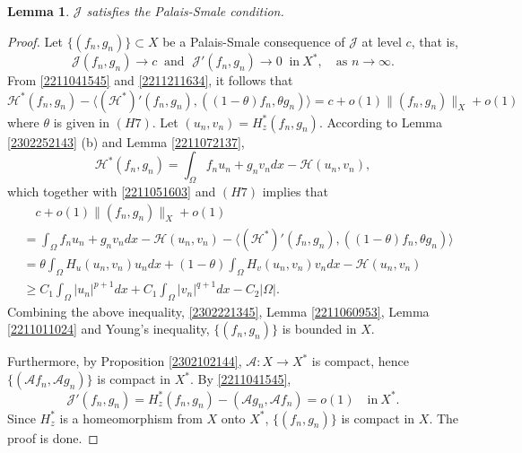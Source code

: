 \documentclass[10pt]{article}
\numberwithin{equation}{section}
\newtheorem{lemma}[theorem]{Lemma}
\numberwithin{equation}{section}
\begin{document}
\begin{lemma}\label{2211171422}
$\mathcal J$ satisfies the Palais-Smale condition.
\end{lemma}
\begin{proof}
 Let $\{(f_n, g_n)\}\subset X$ be a Palais-Smale consequence of $\mathcal{J}$ at level $c$, that is,
\begin{equation}\label{2211041545}
\mathcal{J}(f_n, g_n)\to c\;\; \mbox{and }\; \mathcal{J}'(f_n, g_n)\to 0\;\; \text{in}~X^*, \quad \mbox{as $n\to \infty$}.
\end{equation}
From \eqref{2211041545} and \eqref{2211211634}, it follows that
\begin{equation}\label{2211051603}
\mathcal{H}^*(f_n, g_n)-\langle (\mathcal{H}^*)'(f_n, g_n), ((1-\theta) f_n, \theta g_n)\rangle=c+o(1)\|(f_n, g_n)\|_{X}+o(1)
\end{equation}
where $\theta$ is given in $(H7)$. Let $(u_n ,v_n)=H^*_z(f_n, g_n)$. According to Lemma \ref{2302252143} (b) and Lemma \ref{2211072137},
\begin{equation}\label{2302221345}
\mathcal{H}^*(f_n, g_n)=\int_{\Omega}f_nu_n+g_nv_ndx - \mathcal{H}(u_n, v_n),
\end{equation}
which together with \eqref{2211051603} and $(H7)$ implies that
\[
\begin{aligned}
&\quad c+o(1)\|(f_n, g_n)\|_{X}+o(1)\\
& = \int_{\Omega}f_nu_n+g_nv_n dx - \mathcal{H}(u_n, v_n)-\langle (\mathcal{H}^*)'(f_n, g_n), ((1-\theta) f_n, \theta g_n)\rangle\\
& = \theta\int_{\Omega} H_u(u_n, v_n)u_ndx+(1-\theta)\int_{\Omega} H_v(u_n, v_n)v_ndx- \mathcal{H}(u_n, v_n)\\
& \ge C_1\int_{\Omega}|u_n|^{p+1}dx+C_1\int_{\Omega}|v_n|^{q+1}dx-C_2|\Omega|.
\end{aligned}
\]
Combining the above inequality, \eqref{2302221345}, Lemma \ref{2211060953}, Lemma \ref{2211011024} and Young's inequality,  $\{(f_n, g_n)\}$ is bounded in $X$.

Furthermore, by Proposition \ref{2302102144}, $\mathcal{A}: X\to X^*$ is compact, hence $\{(\mathcal{A}f_n, \mathcal{A}g_n)\}$ is compact in $X^*$. By \eqref{2211041545},
\begin{equation}\label{2211050929}
\mathcal{J}'(f_n, g_n)=H^*_z(f_n, g_n)-(\mathcal{A}g_n, \mathcal{A}f_n)=o(1)\quad \text{in}~X^*.
\end{equation}
Since $H^*_z$ is a homeomorphism from $X$ onto $X^*$, $\{(f_n, g_n)\}$ is compact in $X$. The proof is done.
\end{proof}
\end{document}
